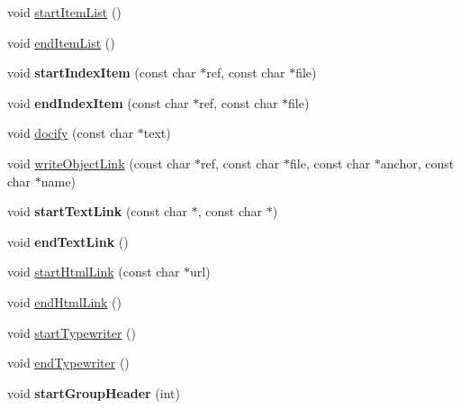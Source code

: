 \begin{DoxyCompactItemize}
void \mbox{\hyperlink{class_latex_generator_a19bab2ba8d61d4a574805610d1a639e6}{start\+Item\+List}} ()
\item 
void \mbox{\hyperlink{class_latex_generator_ad126330bd7b18c670464599fdfc262ab}{end\+Item\+List}} ()
\item 
\mbox{\label{class_latex_generator_ab0de1c1879b785306e363c0a69b424f0}} 
void {\bfseries start\+Index\+Item} (const char $\ast$ref, const char $\ast$file)
\item 
\mbox{\label{class_latex_generator_aa13c2f059e998cf6d794a3cf22d98591}} 
void {\bfseries end\+Index\+Item} (const char $\ast$ref, const char $\ast$file)
\item 
void \mbox{\hyperlink{class_latex_generator_ad6786a95e819d8af4dbfa717207cc674}{docify}} (const char $\ast$text)
\item 
void \mbox{\hyperlink{class_latex_generator_a882b1439eadf3f6b28ba7ae0f8e22873}{write\+Object\+Link}} (const char $\ast$ref, const char $\ast$file, const char $\ast$anchor, const char $\ast$name)
\item 
\mbox{\label{class_latex_generator_ae4ec8b6a0997e558994bfb9e6a8a0e79}} 
void {\bfseries start\+Text\+Link} (const char $\ast$, const char $\ast$)
\item 
\mbox{\label{class_latex_generator_a99844d76a29239103359ea6690a37efe}} 
void {\bfseries end\+Text\+Link} ()
\item 
void \mbox{\hyperlink{class_latex_generator_a491cb262e91a3f16b37d5dd2017e2f6a}{start\+Html\+Link}} (const char $\ast$url)
\item 
void \mbox{\hyperlink{class_latex_generator_a28854e0713249d4ee70a0544b0ebfed5}{end\+Html\+Link}} ()
\item 
void \mbox{\hyperlink{class_latex_generator_a72fe56f1f20836344b8fdf003c1a442e}{start\+Typewriter}} ()
\item 
void \mbox{\hyperlink{class_latex_generator_a40c84d4660b7514fb336c18544005b52}{end\+Typewriter}} ()
\item 
\mbox{\label{class_latex_generator_ad2a9b94fc5f35298fc6a1e96c3b1b7d4}} 
void {\bfseries start\+Group\+Header} (int)
\item 
\mbox{\label{class_latex_generator_ab3f17e3b2554190c3f5440e02ef20cd6}} 

\end{DoxyCompactItemize}
